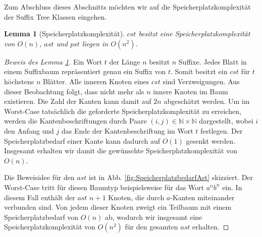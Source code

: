 \documentclass[12pt]{report}
\newtheorem{lemma}{Lemma}
\begin{document}
Zum Abschluss dieses Abschnitts möchten wir auf die Speicherplatzkomplexität der Suffix Tree Klassen eingehen.

\begin{lemma}[Speicherplatzkomplexität]
$cst$ besitzt eine Speicherplatzkomplexität von $O(n)$, $ast$ und $pst$ liegen in $O(n^2)$.
\label{lem:SpeicherplatzkomplexitaetCst}
\end{lemma}

\begin{proof}[Beweis des Lemma \ref{lem:SpeicherplatzkomplexitaetCst}]
Ein Wort $t$ der Länge $n$ besitzt $n$ Suffixe. Jedes Blatt in einem Suffixbaum repräsentiert genau ein Suffix von $t$. Somit besitzt ein $cst$ für $t$ höchstens $n$ Blätter. Alle inneren Knoten eines $cst$ sind Verzweigungen. Aus dieser Beobachtung folgt, dass nicht mehr als $n$ innere Knoten im Baum existieren. Die Zahl der Kanten kann damit auf $2n$ abgeschätzt werden. Um im Worst-Case tatsächlich die geforderte Speicherplatzkomplexität zu erreichen, werden die Kantenbeschriftungen durch Paare $(i, j) \in \mathbb{N} \times \mathbb{N}$ dargestellt, wobei $i$ den Anfang und $j$ das Ende der Kantenbeschriftung im Wort $t$ festlegen. Der Speicherplatzbedarf einer Kante kann dadurch auf $O(1)$ gesenkt werden. Insgesamt erhalten wir damit die gewünschte Speicherplatzkomplexität von $O(n)$.

Die Beweisidee für den $ast$ ist in Abb. \ref{fig:SpeicherplatzbedarfAst} skizziert. Der Worst-Case tritt für diesen Baumtyp beispielsweise für das Wort $a^nb^n$ ein. In diesem Fall enthält der $ast$ $n + 1$ Knoten, die durch $a$-Kanten miteinander verbunden sind. Von jedem dieser Knoten zweigt ein Teilbaum mit einem Speicherplatzbedarf von $O(n)$ ab, wodurch wir insgesamt eine Speicherplatzkomplexität von $O(n^2)$ für den gesamten $ast$ erhalten.


\end{proof}
\end{document}
